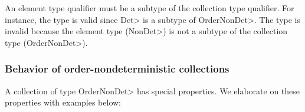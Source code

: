An element type qualifier must be a subtype of the collection type qualifier.
For instance, the type  is valid since \<Det> is a subtype of
\<OrderNonDet>. The type  is invalid because the element type
(\<NonDet>) is not a subtype of the collection type (\<OrderNonDet>).


\subsubsection{Behavior of order-nondeterministic collections}\label{sec:ond-behavior}
A collection of type \<OrderNonDet> has special properties. We elaborate on these properties
with examples below:

